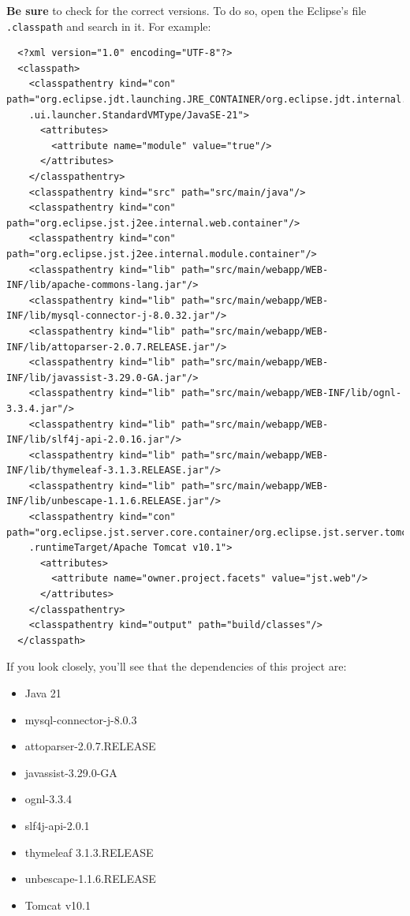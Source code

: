\begin{warning}{}
  \textbf{Be sure} to check for the correct versions. To do so, open the Eclipse's file \texttt{.classpath} and search in it. For example:
  {\scriptsize
  \begin{verbatim}
  <?xml version="1.0" encoding="UTF-8"?>
  <classpath>
    <classpathentry kind="con" path="org.eclipse.jdt.launching.JRE_CONTAINER/org.eclipse.jdt.internal.debug
    .ui.launcher.StandardVMType/JavaSE-21">
      <attributes>
        <attribute name="module" value="true"/>
      </attributes>
    </classpathentry>
    <classpathentry kind="src" path="src/main/java"/>
    <classpathentry kind="con" path="org.eclipse.jst.j2ee.internal.web.container"/>
    <classpathentry kind="con" path="org.eclipse.jst.j2ee.internal.module.container"/>
    <classpathentry kind="lib" path="src/main/webapp/WEB-INF/lib/apache-commons-lang.jar"/>
    <classpathentry kind="lib" path="src/main/webapp/WEB-INF/lib/mysql-connector-j-8.0.32.jar"/>
    <classpathentry kind="lib" path="src/main/webapp/WEB-INF/lib/attoparser-2.0.7.RELEASE.jar"/>
    <classpathentry kind="lib" path="src/main/webapp/WEB-INF/lib/javassist-3.29.0-GA.jar"/>
    <classpathentry kind="lib" path="src/main/webapp/WEB-INF/lib/ognl-3.3.4.jar"/>
    <classpathentry kind="lib" path="src/main/webapp/WEB-INF/lib/slf4j-api-2.0.16.jar"/>
    <classpathentry kind="lib" path="src/main/webapp/WEB-INF/lib/thymeleaf-3.1.3.RELEASE.jar"/>
    <classpathentry kind="lib" path="src/main/webapp/WEB-INF/lib/unbescape-1.1.6.RELEASE.jar"/>
    <classpathentry kind="con" path="org.eclipse.jst.server.core.container/org.eclipse.jst.server.tomcat
    .runtimeTarget/Apache Tomcat v10.1">
      <attributes>
        <attribute name="owner.project.facets" value="jst.web"/>
      </attributes>
    </classpathentry>
    <classpathentry kind="output" path="build/classes"/>
  </classpath>
  \end{verbatim}
  }
  If you look closely, you'll see that the dependencies of this project are:
  \begin{itemize}
    \item Java 21
    \item mysql-connector-j-8.0.3
    \item attoparser-2.0.7.RELEASE
    \item javassist-3.29.0-GA
    \item ognl-3.3.4
    \item slf4j-api-2.0.1
    \item thymeleaf 3.1.3.RELEASE
    \item unbescape-1.1.6.RELEASE
    \item Tomcat v10.1
  \end{itemize}
\end{warning}

